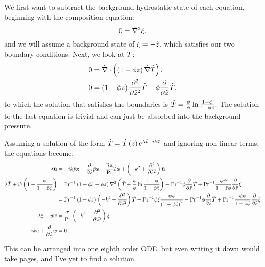 	We first want to subtract the background hydrostatic state of each equation, beginning with the composition equation:
	\begin{equation}
		0=\hat{\nabla}^{2}\xi,
	\end{equation}
	and we will assume a background state of $\xi=-\hat{z}$, which satisfies our two boundary conditions.
	Next, we look at $T$:
	\begin{align}
		0&=\hat{\nabla}\cdot\left(\left(1-\phi z\right)\hat{\nabla}\hat{T}\right),\\
		0&=\left(1-\phi z\right)\frac{\partial^{2}}{\partial \hat{z}^{2}}\hat{T}-\phi\frac{\partial}{\partial \hat{z}}\hat{T},\\
	\end{align}
	to which the solution that satisfies the boundaries is $\hat{T}=\frac{\psi}{\phi}\ln{\frac{1-\phi}{1-\phi \hat{z}}}$.
	The solution to the last equation is trivial and can just be absorbed into the background pressure.

	Assuming a solution of the form $\hat{T}=\hat{T}\left(z\right)e^{\lambda \hat{t} + i k \hat{x}}$ and ignoring non-linear terms, the equations become:
	\begin{align}
		\lambda\hat{\mathbf{u}}&=-ik\hat{p}\mathbf{x}-\frac{\partial}{\partial \hat{z}}\hat{p}\mathbf{z}+\frac{\mathrm{Ra}}{\mathrm{Pr}}\hat{T}\mathbf{z}+\left(-k^{2}+\frac{\partial^{2}}{\partial \hat{z}^{2}}\right)\hat{\mathbf{u}}\\ 
		\lambda\hat{T}+\hat{w}\left(1 + \frac{\psi}{1-\hat{z}\phi}\right)&=\mathrm{Pr}^{-1}\left(1+\phi\xi-\phi z\right)\nabla^{2}\left(\hat{T}+\frac{\psi}{\phi}\ln{\frac{1-\phi}{1-\phi \hat{z}}}\right)-\mathrm{Pr}^{-1}\phi\frac{\partial}{\partial \hat{z}}\hat{T}+\mathrm{Pr}^{-1}\frac{\phi\psi}{1-\hat{z}\phi}\frac{\partial}{\partial \hat{z}}\xi\\
		&=\mathrm{Pr}^{-1}\left(1-\phi z\right)\left(-k^{2}+\frac{\partial^{2}}{\partial \hat{z}^{2}}\right)\hat{T}+\mathrm{Pr}^{-1}\phi\xi\frac{\psi\phi}{\left(1-\phi \hat{z}\right)^{2}}-\mathrm{Pr}^{-1}\phi\frac{\partial}{\partial \hat{z}}\hat{T}+\mathrm{Pr}^{-1}\frac{\phi\psi}{1-\hat{z}\phi}\frac{\partial}{\partial \hat{z}}\xi\\
		\lambda\xi-\hat{w}\hat{z}&=\frac{\tau}{\mathrm{Pr}}\left(-k^{2}+\frac{\partial^{2}}{\partial \hat{z}^{2}}\right)\xi\\
		ik\hat{u} + \frac{\partial}{\partial \hat{z}}\hat{w}&=0
	\end{align}

	This can be arranged into one eighth order ODE, but even writing it down would take pages, and I've yet to find a solution.

